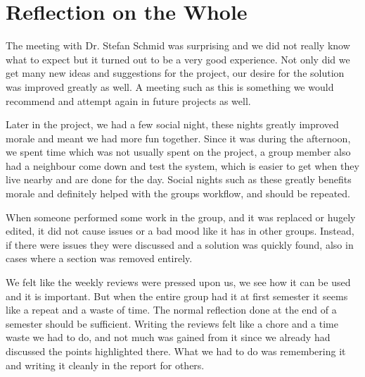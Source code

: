 \section{Reflection on the Whole}\label{sec:FinRef}
The meeting with Dr. Stefan Schmid was surprising and we did
not really know what to expect but it turned out to be a very good experience. Not only
did we get many new ideas and suggestions for the project, our desire for the
solution was improved greatly as well. A meeting such as this is something we
would recommend and attempt again in future projects as well.\nl

Later in the project, we had a few social night, these nights greatly improved
morale and meant we had more fun together. Since it was during the afternoon,
we spent time which was not usually spent on the project, a group member also
had a neighbour come down and test the system, which is easier to get when they
live nearby and are done for the day. Social nights such as these greatly
benefits morale and definitely helped with the groups workflow, and should be
repeated.\nl

When someone performed some work in the group, and it was replaced or hugely
edited, it did not cause issues or a bad mood like it has in other groups.
Instead, if there were issues they were discussed and a solution was quickly
found, also in cases where a section was removed entirely.\nl

We felt like the weekly reviews were pressed upon us, we see how it can be used
and it is important. But when the entire group had it at first semester it seems
like a repeat and a waste of time. The normal reflection done at the end of a
semester should be sufficient. Writing the reviews felt like a chore and a time
waste we had to do, and not much was gained from it since we already had
discussed the points highlighted there. What we had to do was remembering it and
writing it cleanly in the report for others.